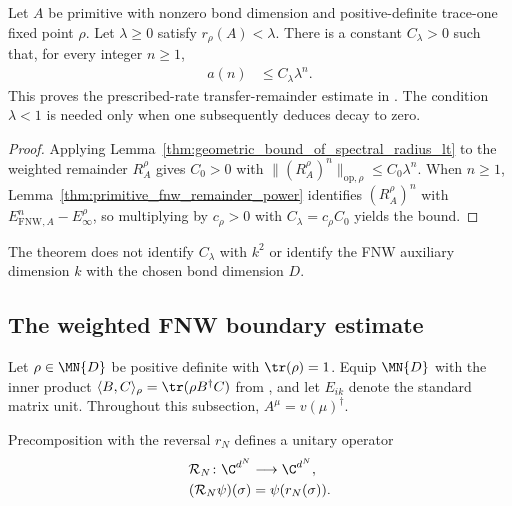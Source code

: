 \begin{lemma}
    \label{thm:fnw_mixing_quantity_geometric}
    \leanok
    Let $A$ be primitive with nonzero bond dimension and positive-definite
    trace-one fixed point $\rho$.  Let $\lambda\geq0$ satisfy
    $r_\rho(A)<\lambda$.  There is a constant $C_\lambda>0$ such that, for
    every integer $n\geq1$,
    \begin{align}
        a(n) & \leq C_\lambda\lambda^n.
        \label{eq:fnw_mixing_quantity_geometric}
    \end{align}
    This proves the prescribed-rate transfer-remainder estimate in
    \cite[Lemma~5.2]{Fannes1992Finitely}.  The condition $\lambda<1$ is needed
    only when one subsequently deduces decay to zero.
\end{lemma}

\begin{proof}
    \leanok
    Applying Lemma~\ref{thm:geometric_bound_of_spectral_radius_lt} to the
    weighted remainder $R_A^\rho$ gives $C_0>0$ with
    $\lVert(R_A^\rho)^n\rVert_{\mathrm{op},\rho}
        \leq C_0\lambda^n$.  When $n\geq1$,
    Lemma~\ref{thm:primitive_fnw_remainder_power} identifies
    $(R_A^\rho)^n$ with
    $E_{\mathrm{FNW},A}^n-E_\infty^\rho$, so multiplying by $c_\rho>0$ with
    $C_\lambda=c_\rho C_0$ yields the bound.
\end{proof}

The theorem does not identify $C_\lambda$ with $k^2$ or identify the FNW auxiliary dimension $k$ with the chosen bond dimension $D$.

\subsection{The weighted FNW boundary estimate}
\label{subsec:fnw_weighted_boundary_estimate}

Let $\rho\in\MN{D}$ be positive definite with $\tr(\rho)=1$. Equip
$\MN{D}$ with the inner product
$\langle B,C\rangle_\rho=\tr(\rho B^\dagger C)$ from
\cite[Equation~(5.6)]{Fannes1992Finitely}, and let $E_{ik}$ denote the
standard matrix unit. Throughout this subsection,
$A^\mu=v(\mu)^\dagger$.

\begin{definition}
    \label{def:physical_site_reverse_es}
    \leanok
    Precomposition with the reversal $r_N$ defines a unitary operator
    \begin{align}
        \mathcal R_N\colon\C^{d^N}
         & \longrightarrow\C^{d^N}, \\
        (\mathcal R_N\psi)(\sigma)
         & =\psi(r_N(\sigma)).
        \label{eq:fnw_physical_reverse_es}
    \end{align}
\end{definition}

